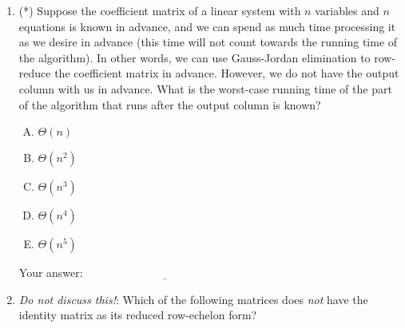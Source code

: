 \documentclass[10pt]{amsart}
\begin{document}
\begin{enumerate}
\item (*) Suppose the coefficient matrix of a linear system with $n$
  variables and $n$ equations is known in advance, and we can spend as
  much time processing it as we desire in advance (this time will not
  count towards the running time of the algorithm). In other words, we
  can use Gauss-Jordan elimination to row-reduce the coefficient
  matrix in advance. However, we do not have the output column with us
  in advance. What is the worst-case running time of the part of the
  algorithm that runs after the output column is known?

  \begin{enumerate}[(A)]
  \item $\Theta(n)$
  \item $\Theta(n^2)$
  \item $\Theta(n^3)$
  \item $\Theta(n^4)$
  \item $\Theta(n^5)$
  \end{enumerate}

  \vspace{0.1in}
  Your answer: $\underline{\qquad\qquad\qquad\qquad\qquad\qquad\qquad}$
  \vspace{0.1in}

\item {\em Do not discuss this!}: Which of the following matrices does
  {\em not} have the identity matrix as its reduced row-echelon form?


\end{enumerate}
\end{document}
